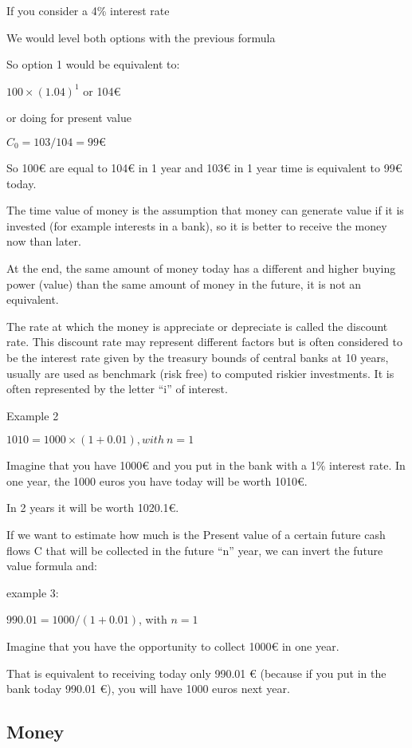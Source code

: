 \documentclass[]{book}
\newcommand{\euro}{€}
\theoremstyle{definition}
\theoremstyle{definition}
\theoremstyle{definition}
\theoremstyle{remark}
\begin{document}
If you consider a 4\% interest rate

We would level both options with the previous formula

So option 1 would be equivalent to:

\(100 \times (1.04)^1\) or 104\euro{}

or doing for present value

\(C_0 =103/104 = 99€\)

So 100\euro{} are equal to 104\euro{} in 1 year and 103\euro{} in 1 year
time is equivalent to 99\euro{} today.

The time value of money is the assumption that money can generate value
if it is invested (for example interests in a bank), so it is better to
receive the money now than later.

At the end, the same amount of money today has a different and higher
buying power (value) than the same amount of money in the future, it is
not an equivalent.

The rate at which the money is appreciate or depreciate is called the
discount rate. This discount rate may represent different factors but is
often considered to be the interest rate given by the treasury bounds of
central banks at 10 years, usually are used as benchmark (risk free) to
computed riskier investments. It is often represented by the letter
``i'' of interest.

Example 2

\(1010=1000\times(1+0.01), with \ n=1\)

Imagine that you have 1000\euro{} and you put in the bank with a 1\%
interest rate. In one year, the 1000 euros you have today will be worth
1010\euro{}.

In 2 years it will be worth 1020.1\euro{}.

If we want to estimate how much is the Present value of a certain future
cash flows C that will be collected in the future ``n'' year, we can
invert the future value formula and:

example 3:

\(990.01=1000/(1+0.01)\), with \(n=1\)

Imagine that you have the opportunity to collect 1000\euro{} in one
year.

That is equivalent to receiving today only 990.01 \euro{} (because if
you put in the bank today 990.01 \euro{}), you will have 1000 euros next
year.

\subsection{Money}\label{money}
\end{document}
